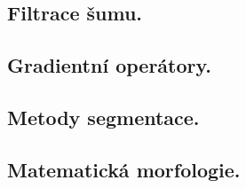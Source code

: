 \subsection{Filtrace šumu.}

\subsection{Gradientní operátory.}

\subsection{Metody segmentace.}

\subsection{Matematická morfologie.}